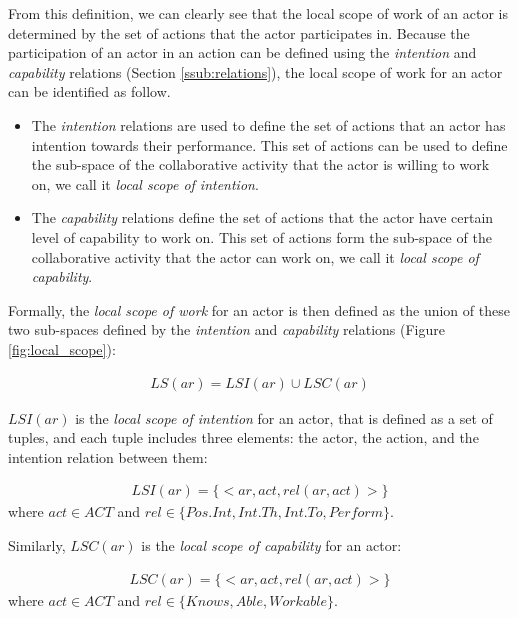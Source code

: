 From this definition, we can clearly see that the local scope of work of an actor is determined by the set of actions that the actor participates in. Because the participation of an actor in an action can be defined using the \emph{intention} and \emph{capability} relations (Section \ref{ssub:relations}), the local scope of work for an actor can be identified as follow. 

\begin{itemize}
	\item The \emph{intention} relations are used to define the set of actions that an actor has intention towards their performance. This set of actions can be used to define the sub-space of the collaborative activity that the actor is willing to work on, we call it \emph{local scope of intention}.
	\item The \emph{capability} relations define the set of actions that the actor have certain level of capability to work on. This set of actions form the sub-space of the collaborative activity that the actor can work on, we call it \emph{local scope of capability}.
\end{itemize}

Formally, the \emph{local scope of work} for an actor is then defined as the union of these two sub-spaces defined by the \emph{intention} and \emph{capability} relations (Figure \ref{fig:local_scope}):

\begin{align*} 
	LS(ar) = LSI(ar) \cup LSC(ar)
\end{align*}

$LSI(ar)$ is the \emph{local scope of intention} for an actor, that is defined as a set of tuples, and each tuple includes three elements: the actor, the action, and the intention relation between them:

\begin{align*} 
	LSI(ar) = \{<ar, act, rel(ar, act)>\}
\end{align*}
where $act\in ACT$ and $rel\in \{Pos.Int, Int.Th, Int.To, Perform\}$.

Similarly, $LSC(ar)$ is the \emph{local scope of capability} for an actor:

\begin{align*} 
	LSC(ar) = \{<ar, act, rel(ar, act)>\}
\end{align*}
where $act\in ACT$ and $rel\in \{Knows, Able, Workable\}$.


